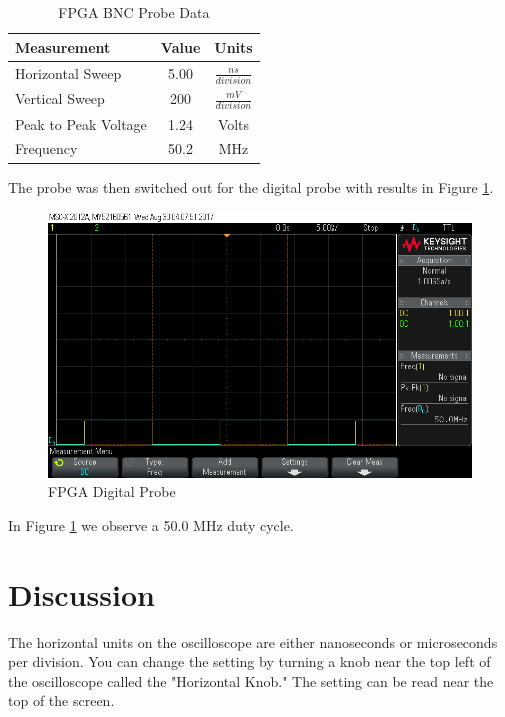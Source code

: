 \documentclass[journal,onecolumn]{IEEEtran}
\begin{document}
\begin{table}[H]
	\centering
	\caption{FPGA BNC Probe Data}
	\label{tab:FPGA_BPrb}
	\begin{tabular}{|l|c|c|}
		\hline
		\textbf{Measurement} & \textbf{Value} & \textbf{Units}                        \\ \hline
		\rule{0pt}{4ex}  Horizontal Sweep     & 5.00           & $\frac{ns}{division}$ \\ \hline
		\rule{0pt}{4ex}  Vertical Sweep       & 200            & $\frac{mV}{division}$  \\ \hline
		\rule{0pt}{4ex}  Peak to Peak Voltage & 1.24           & Volts                   \\ \hline
		\rule{0pt}{4ex}  Frequency            & 50.2           & MHz                      \\ \hline
	\end{tabular}
\end{table}
\newpage
The probe was then switched out for the digital probe with results in Figure \ref{fig:FPGA-D}.
\begin{figure}[H]
	\includegraphics[width=18cm]{digital_2.png}
	\centering
	\caption{FPGA Digital Probe}
	\label{fig:FPGA-D}
\end{figure}
In Figure \ref{fig:FPGA-D} we observe a 50.0 MHz duty cycle.



\section*{Discussion}
The horizontal units on the oscilloscope are either nanoseconds or microseconds per division. You can change the setting by turning a knob near the top left of the oscilloscope called the "Horizontal Knob." The setting can be read near the top of the screen.
\end{document}

